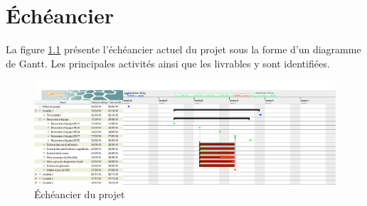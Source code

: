 \chapter{Échéancier}
\label{s:echeancier}

La figure \ref{fig:gantt} présente l'échéancier actuel du projet sous la forme d'un diagramme de Gantt. Les principales activités ainsi que les livrables y sont identifiées.

\begin{figure}[p]
	\centering
	\includegraphics[width=\textwidth, angle=90]{fig/gantt.png}
	\caption{Échéancier du projet}
	\label{fig:gantt}
\end{figure}